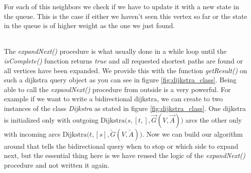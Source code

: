 For each of this neighbors we check if we have to update it with a new state in the queue.
This is the case if either we haven't seen this vertex so far or the state in the queue is of higher weight as the one we just found.

\\
The \textit{expandNext()} procedure is what usually done in a while loop until the \textit{isComplete()} function returns \textit{true} and all requested shortest paths are found or all vertices have been expanded.
We provide this with the function \textit{getResult()} on such a dijkstra query object as you can see in figure \ref{fig:dijkstra_class}.
Being able to call the \textit{expandNext()} procedure from outside is a very powerful.
For example if we want to write a bidirectional dijkstra, we can create to two instances of the class \textit{Dijkstra} as stated in figure \ref{fig:dijkstra_class}.
One dijkstra is initialized only with outgoing $\text{Dijkstra(}s, [t,], \overrightarrow{G}(V, \overrightarrow{A}) \text{)}$ arcs the other only with incoming arcs $\text{Dijkstra(}t, [s], \overleftarrow{G}(V, \overleftarrow{A}) \text{)}$.
Now we can build our algorithm around that tells the bidirectional query when to stop or which side to expand next, but the essential thing here is we have reused the logic of the \textit{expandNext()} procedure and not written it again.
